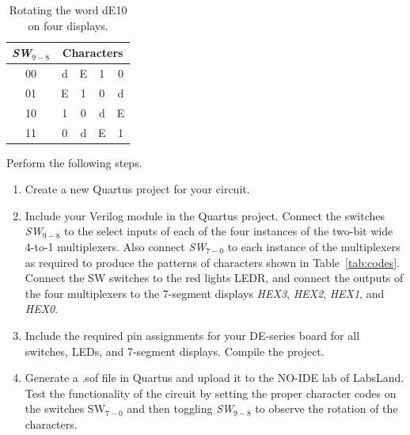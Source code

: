 \documentclass[epsfig,10pt,fullpage]{article}
\begin{document}
\begin{table}[H]
\begin{minipage}[t]{12.5 cm}
\begin{center}
\begin{tabular}{c|cccc}
{\it SW}$_{9-8}$ & \multicolumn{4}{c}{Characters} \\
\hline
{\rule[0mm]{0mm}{5mm}00} & d & E & 1 & 0\\ 
01 & E & 1 & 0 & d\\
10 & 1 & 0 & d & E\\
11 & 0 & d & E & 1\\
\end{tabular}
\end{center}
\end{minipage}
\caption{Rotating the word dE10 on four displays.}
\label{tab:rotate}
\end{table}

Perform the following steps.
\begin{enumerate}
\item Create a new Quartus project for your circuit.
\item Include your Verilog module in the Quartus project. Connect the switches 
{\it SW}$_{9-8}$ to the select inputs of each of the four instances of the two-bit 
wide 4-to-1 multiplexers. Also connect {\it SW}$_{7-0}$ to each instance of the
multiplexers as required to produce the patterns of characters shown in Table~\ref{tab:codes}.
Connect the SW switches to the red lights LEDR, and connect the outputs of the four 
multiplexers to the 7-segment displays {\it HEX3}, {\it HEX2}, {\it HEX1}, and {\it HEX0}.
\item Include the required pin assignments for your DE-series board for all switches, LEDs, 
and 7-segment displays. Compile the project.
\item Generate a .sof file in Quartus and upload it to the NO-IDE lab of LabsLand. Test the functionality of the 
circuit by setting the proper character codes on the switches SW$_{7-0}$ and then 
toggling {\it SW}$_{9-8}$ to observe the rotation of the characters.
\end{enumerate}
\end{document}
